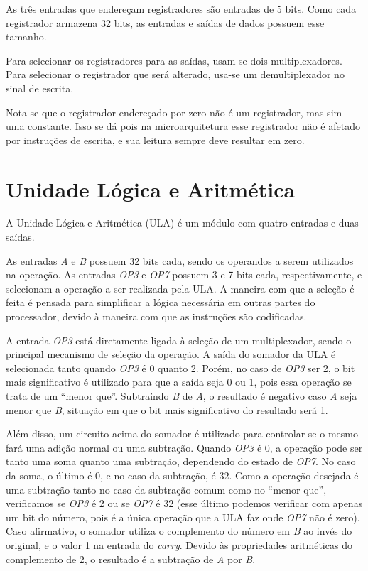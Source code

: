 \documentclass[twocolumn]{article}
\newcommand{\circuit}[1]{}
\begin{document}
As três entradas que endereçam registradores são entradas de 5 bits. Como cada
registrador armazena 32 bits, as entradas e saídas de dados possuem esse
tamanho.

Para selecionar os registradores para as saídas, usam-se dois
multiplexadores. Para selecionar o registrador que será alterado, usa-se um
demultiplexador no sinal de escrita.

Nota-se que o registrador endereçado por zero não é um registrador, mas sim uma
constante. Isso se dá pois na microarquitetura esse registrador não é afetado
por instruções de escrita, e sua leitura sempre deve resultar em zero.

\section{Unidade Lógica e Aritmética}

A Unidade Lógica e Aritmética (ULA) é um módulo com quatro entradas e duas
saídas.

\circuit{alu}

As entradas \textit{A} e \textit{B} possuem 32 bits cada, sendo os operandos a
serem utilizados na operação. As entradas \textit{OP3} e \textit{OP7} possuem 3
e 7 bits cada, respectivamente, e selecionam a operação a ser realizada pela
ULA. A maneira com que a seleção é feita é pensada para simplificar a lógica
necessária em outras partes do processador, devido à maneira com que as
instruções são codificadas.

A entrada \textit{OP3} está diretamente ligada à seleção de um multiplexador,
sendo o principal mecanismo de seleção da operação. A saída do somador da ULA é
selecionada tanto quando \textit{OP3} é 0 quanto 2. Porém, no caso de
\textit{OP3} ser 2, o bit mais significativo é utilizado para que a saída seja 0
ou 1, pois essa operação se trata de um ``menor que''. Subtraindo \textit{B} de
\textit{A}, o resultado é negativo caso \textit{A} seja menor que \textit{B},
situação em que o bit mais significativo do resultado será 1.

Além disso, um circuito acima do somador é utilizado para controlar se o mesmo
fará uma adição normal ou uma subtração. Quando \textit{OP3} é 0, a operação
pode ser tanto uma soma quanto uma subtração, dependendo do estado de
\textit{OP7}. No caso da soma, o último é 0, e no caso da subtração, é 32. Como
a operação desejada é uma subtração tanto no caso da subtração comum como no
``menor que'', verificamos se \textit{OP3} é 2 ou se \textit{OP7} é 32 (esse
último podemos verificar com apenas um bit do número, pois é a única operação
que a ULA faz onde \textit{OP7} não é zero). Caso afirmativo, o somador utiliza
o complemento do número em \textit{B} ao invés do original, e o valor 1 na
entrada do \textit{carry}. Devido às propriedades aritméticas do complemento de
2\cite{cornell-notes}, o resultado é a subtração de \textit{A} por \textit{B}.
\end{document}
